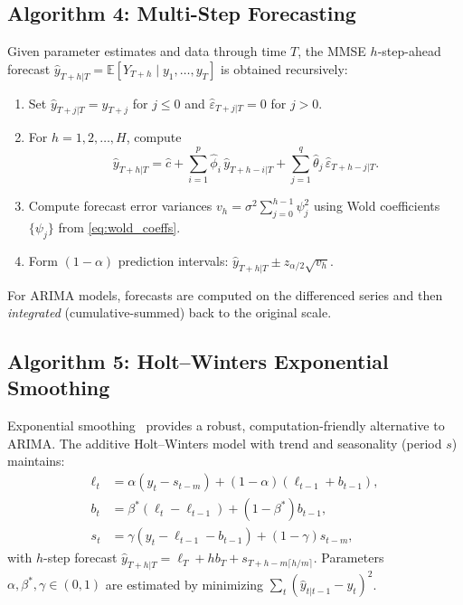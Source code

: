\documentclass[conference]{IEEEtran}
\theoremstyle{definition}
\begin{document}
\subsection{Algorithm 4: Multi-Step Forecasting}

Given parameter estimates and data through time $T$, the MMSE
$h$-step-ahead forecast $\hat{y}_{T+h|T} = \mathbb{E}[Y_{T+h}\mid y_1,\ldots,y_T]$
is obtained recursively:

\begin{enumerate}
  \item Set $\hat{y}_{T+j|T} = y_{T+j}$ for $j \leq 0$ and
        $\hat{\varepsilon}_{T+j|T} = 0$ for $j > 0$.
  \item For $h = 1, 2, \ldots, H$, compute
        \begin{equation}
          \hat{y}_{T+h|T} = \hat{c} + \sum_{i=1}^p \hat{\phi}_i\,\hat{y}_{T+h-i|T}
                            + \sum_{j=1}^q \hat{\theta}_j\,\hat{\varepsilon}_{T+h-j|T}.
          \label{eq:forecast_recursion}
        \end{equation}
  \item Compute forecast error variances
        $v_h = \sigma^2\sum_{j=0}^{h-1}\psi_j^2$ using Wold coefficients
        $\{\psi_j\}$ from \eqref{eq:wold_coeffs}.
  \item Form $(1-\alpha)$ prediction intervals:
        $\hat{y}_{T+h|T} \pm z_{\alpha/2}\sqrt{v_h}$.
\end{enumerate}

For ARIMA models, forecasts are computed on the differenced series and then
\emph{integrated} (cumulative-summed) back to the original scale.

\subsection{Algorithm 5: Holt--Winters Exponential Smoothing}

Exponential smoothing~\cite{holt2004forecasting,winters1960forecasting} provides
a robust, computation-friendly alternative to ARIMA. The additive
Holt--Winters model with trend and seasonality (period $s$) maintains:
\begin{align}
  \ell_t &= \alpha(y_t - s_{t-m}) + (1-\alpha)(\ell_{t-1} + b_{t-1}),
            \label{eq:hw_level}\\
  b_t    &= \beta^*(\ell_t - \ell_{t-1}) + (1-\beta^*)b_{t-1},
            \label{eq:hw_trend}\\
  s_t    &= \gamma(y_t - \ell_{t-1} - b_{t-1}) + (1-\gamma)s_{t-m},
            \label{eq:hw_seasonal}
\end{align}
with $h$-step forecast
$\hat{y}_{T+h|T} = \ell_T + hb_T + s_{T+h-m\lceil h/m\rceil}$.
Parameters $\alpha, \beta^*, \gamma \in (0,1)$ are estimated by minimizing
$\sum_t(\hat{y}_{t|t-1} - y_t)^2$.
\end{document}
